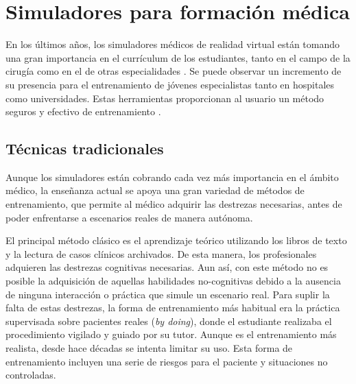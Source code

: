 \section{Simuladores para formación médica}
\label{art:medicalsim}

En los últimos años, los simuladores médicos de realidad virtual están tomando una gran importancia en el currículum de los estudiantes, tanto en el campo de la cirugía como en el de otras especialidades \cite{PATEL2017266.e7}. Se puede observar un incremento de su presencia para el entrenamiento de jóvenes especialistas tanto en hospitales como universidades. Estas herramientas proporcionan al usuario un método seguros y efectivo de entrenamiento \cite{simsafety}.

\subsection{Técnicas tradicionales}

Aunque los simuladores están cobrando cada vez más importancia en el ámbito médico, la enseñanza actual se apoya una gran variedad de métodos de entrenamiento, que permite al médico adquirir las destrezas necesarias, antes de poder enfrentarse a escenarios reales de manera autónoma. 


El principal método clásico es el aprendizaje teórico utilizando los libros de texto y la lectura de casos clínicos archivados. 
De esta manera, los profesionales adquieren las destrezas cognitivas necesarias. Aun así, con este método no es posible la adquisición de aquellas habilidades no-cognitivas debido a la ausencia de ninguna interacción o práctica que simule un escenario real. 
Para suplir la falta de estas destrezas, la forma de entrenamiento más habitual era la práctica supervisada sobre pacientes reales (\emph{by doing}), donde el estudiante realizaba el procedimiento vigilado y guiado por su tutor. Aunque es el entrenamiento más realista, desde hace décadas se intenta limitar su uso. Esta forma de entrenamiento incluyen una serie de riesgos para el paciente y situaciones no controladas. 

